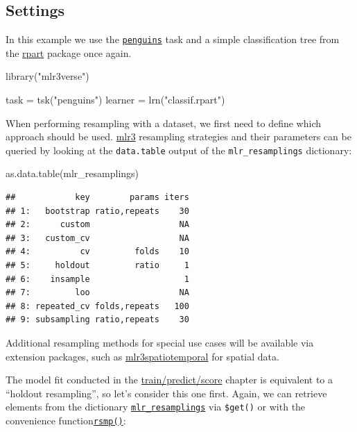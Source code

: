 \documentclass[
]{scrbook}
\newenvironment{Shaded}{\begin{snugshade}}{\end{snugshade}}
\newcommand{\FunctionTok}[1]{\textcolor[rgb]{0.00,0.00,0.00}{#1}}
\newcommand{\NormalTok}[1]{#1}
\newcommand{\OtherTok}[1]{\textcolor[rgb]{0.56,0.35,0.01}{#1}}
\newcommand{\StringTok}[1]{\textcolor[rgb]{0.31,0.60,0.02}{#1}}
\renewenvironment{Shaded} {\begin{snugshade}\small} {\end{snugshade}}
\begin{document}
\hypertarget{resampling-settings}{%
\subsection{Settings}\label{resampling-settings}}

In this example we use the \href{https://mlr3.mlr-org.com/reference/mlr_tasks_penguins.html}{\texttt{penguins}} task and a simple classification tree from the \href{https://cran.r-project.org/package=rpart}{rpart} package once again.

\begin{Shaded}
\begin{Highlighting}[]
\FunctionTok{library}\NormalTok{(}\StringTok{"mlr3verse"}\NormalTok{)}

\NormalTok{task }\OtherTok{=} \FunctionTok{tsk}\NormalTok{(}\StringTok{"penguins"}\NormalTok{)}
\NormalTok{learner }\OtherTok{=} \FunctionTok{lrn}\NormalTok{(}\StringTok{"classif.rpart"}\NormalTok{)}
\end{Highlighting}
\end{Shaded}

When performing resampling with a dataset, we first need to define which approach should be used.
\href{https://mlr3.mlr-org.com}{mlr3} resampling strategies and their parameters can be queried by looking at the \texttt{data.table} output of the \texttt{mlr\_resamplings} dictionary:

\begin{Shaded}
\begin{Highlighting}[]
\FunctionTok{as.data.table}\NormalTok{(mlr\_resamplings)}
\end{Highlighting}
\end{Shaded}

\begin{verbatim}
##            key        params iters
## 1:   bootstrap ratio,repeats    30
## 2:      custom                  NA
## 3:   custom_cv                  NA
## 4:          cv         folds    10
## 5:     holdout         ratio     1
## 6:    insample                   1
## 7:         loo                  NA
## 8: repeated_cv folds,repeats   100
## 9: subsampling ratio,repeats    30
\end{verbatim}

Additional resampling methods for special use cases will be available via extension packages, such as \href{https://github.com/mlr-org/mlr3spatiotemporal}{mlr3spatiotemporal} for spatial data.

The model fit conducted in the \protect\hyperlink{train-predict}{train/predict/score} chapter is equivalent to a ``holdout resampling'', so let's consider this one first.
Again, we can retrieve elements from the dictionary \href{https://mlr3.mlr-org.com/reference/mlr_resamplings.html}{\texttt{mlr\_resamplings}} via \texttt{\$get()} or with the convenience function\href{https://mlr3.mlr-org.com/reference/mlr_sugar.html}{\texttt{rsmp()}}:
\end{document}
